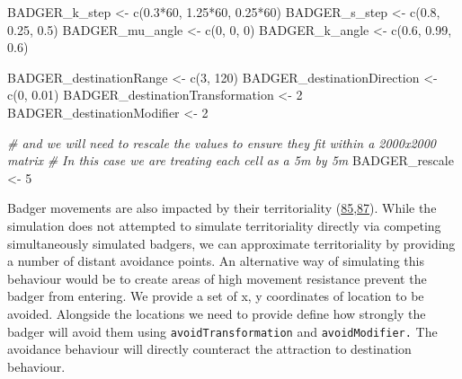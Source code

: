 \documentclass[10pt,a4paper]{article}
\newenvironment{Shaded}{}{}
\newcommand{\CommentTok}[1]{\textit{#1}}
\newcommand{\DecValTok}[1]{#1}
\newcommand{\FloatTok}[1]{#1}
\newcommand{\FunctionTok}[1]{#1}
\newcommand{\NormalTok}[1]{#1}
\newcommand{\OtherTok}[1]{#1}
\newcommand{\SpecialCharTok}[1]{#1}
\begin{document}
\begin{Shaded}
\begin{Highlighting}[]
\NormalTok{BADGER\_k\_step }\OtherTok{\textless{}{-}} \FunctionTok{c}\NormalTok{(}\FloatTok{0.3}\SpecialCharTok{*}\DecValTok{60}\NormalTok{, }\FloatTok{1.25}\SpecialCharTok{*}\DecValTok{60}\NormalTok{, }\FloatTok{0.25}\SpecialCharTok{*}\DecValTok{60}\NormalTok{)}
\NormalTok{BADGER\_s\_step }\OtherTok{\textless{}{-}} \FunctionTok{c}\NormalTok{(}\FloatTok{0.8}\NormalTok{, }\FloatTok{0.25}\NormalTok{, }\FloatTok{0.5}\NormalTok{)}
\NormalTok{BADGER\_mu\_angle }\OtherTok{\textless{}{-}} \FunctionTok{c}\NormalTok{(}\DecValTok{0}\NormalTok{, }\DecValTok{0}\NormalTok{, }\DecValTok{0}\NormalTok{)}
\NormalTok{BADGER\_k\_angle }\OtherTok{\textless{}{-}} \FunctionTok{c}\NormalTok{(}\FloatTok{0.6}\NormalTok{, }\FloatTok{0.99}\NormalTok{, }\FloatTok{0.6}\NormalTok{)}

\NormalTok{BADGER\_destinationRange }\OtherTok{\textless{}{-}} \FunctionTok{c}\NormalTok{(}\DecValTok{3}\NormalTok{, }\DecValTok{120}\NormalTok{)}
\NormalTok{BADGER\_destinationDirection }\OtherTok{\textless{}{-}} \FunctionTok{c}\NormalTok{(}\DecValTok{0}\NormalTok{, }\FloatTok{0.01}\NormalTok{)}
\NormalTok{BADGER\_destinationTransformation }\OtherTok{\textless{}{-}} \DecValTok{2}
\NormalTok{BADGER\_destinationModifier }\OtherTok{\textless{}{-}} \DecValTok{2}

\CommentTok{\# and we will need to rescale the values to ensure they fit within a 2000x2000 matrix}
\CommentTok{\# In this case we are treating each cell as a 5m by 5m}
\NormalTok{BADGER\_rescale }\OtherTok{\textless{}{-}} \DecValTok{5}
\end{Highlighting}
\end{Shaded}

Badger movements are also impacted by their territoriality (\protect\hyperlink{ref-feore_habitat_1999}{85},\protect\hyperlink{ref-kelly_extra_2020}{87}).
While the simulation does not attempted to simulate territoriality directly via competing simultaneously simulated badgers, we can approximate territoriality by providing a number of distant avoidance points.
An alternative way of simulating this behaviour would be to create areas of high movement resistance prevent the badger from entering.
We provide a set of x, y coordinates of location to be avoided.
Alongside the locations we need to provide define how strongly the badger will avoid them using \texttt{avoidTransformation} and \texttt{avoidModifier.}
The avoidance behaviour will directly counteract the attraction to destination behaviour.
\end{document}
